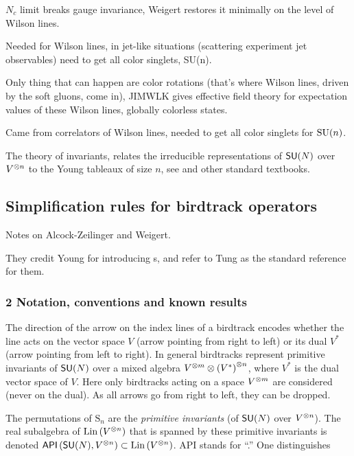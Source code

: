 $N_c$ limit breaks gauge invariance, Weigert restores it minimally on the
level of Wilson lines.

Needed for Wilson lines, in jet-like situations (scattering experiment jet
observables) need to get all color singlets, SU(n).

Only thing that can happen are color rotations (that's where Wilson lines,
driven by the soft gluons, come in), JIMWLK gives effective field theory for
expectation values of these Wilson lines, globally colorless states.

Came from correlators of Wilson lines, needed to get all color singlets for
$\textrm{SU}(n)$.

The theory of invariants,
relates the irreducible representations of $\mathsf{SU}(N)$ over $V^{\otimes n}$
to the Young tableaux of size $n$, see 
and other standard textbooks.


\subsection{Simplification rules for birdtrack operators}
\label{s-AlcZei16-1}

Notes on Alcock-Zeilinger and Weigert.

They credit Young for introducing \Ypo s,
and refer to Tung as the standard reference for them.

\subsubsection{%
2 Notation, conventions and known results}

The direction of the arrow on the index lines of a birdtrack encodes whether
the line acts on the vector space $V$ (arrow pointing from right to left) or
its dual $V^*$ (arrow pointing from left to right).
In general birdtracks represent primitive invariants of $\mathsf{SU}(N)$ over a mixed
algebra $V^{\otimes m}\otimes\left(V^*\right)^{\otimes n}$, where $V^*$ is the dual vector space of $V$.
Here only birdtracks acting on a space $V^{\otimes m}$ are considered (never on the
dual). As all arrows go from right to left, they can be dropped.

The permutations of $\textrm{S}_n$ are the \emph{primitive invariants}
(of $\mathsf{SU}(N)$ over $V^{\otimes n}$).
The real subalgebra of $\mathrm{Lin}\left( V^{\otimes n} \right)$ that is spanned by these primitive
invariants is denoted $\mathsf{API}\left( \mathsf{SU}(N),V^{\otimes n} \right)\subset\mathrm{Lin}\left( V^{\otimes n} \right)$.
{API} stands for ``\api.''
One
distinguishes

